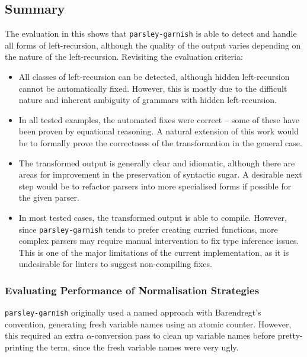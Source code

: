 \documentclass[../../main.tex]{subfiles}
\begin{document}
\subsection*{Summary}
The evaluation in this  shows that \texttt{parsley-garnish} is able to detect and handle all forms of left-recursion, although the quality of the output varies depending on the nature of the left-recursion.
Revisiting the evaluation criteria:
\begin{itemize}
  \item All classes of left-recursion can be detected, although hidden left-recursion cannot be automatically fixed. However, this is mostly due to the difficult nature and inherent ambiguity of grammars with hidden left-recursion.
  \item In all tested examples, the automated fixes were correct -- some of these have been proven by equational reasoning. A natural extension of this work would be to formally prove the correctness of the transformation in the general case.
  \item The transformed output is generally clear and idiomatic, although there are areas for improvement in the preservation of syntactic sugar. A desirable next step would be to refactor  parsers into more specialised forms if possible for the given parser.
  \item In most tested cases, the transformed output is able to compile. However, since \texttt{parsley-garnish} tends to prefer creating curried functions, more complex parsers may require manual intervention to fix type inference issues. This is one of the major limitations of the current implementation, as it is undesirable for linters to suggest non-compiling fixes.
\end{itemize}


\subsubsection{Evaluating Performance of Normalisation Strategies}
\texttt{parsley-garnish} originally used a named approach with Barendregt's convention, generating fresh variable names using an atomic counter.
However, this required an extra $\alpha$-conversion pass to clean up variable names before pretty-printing the term, since the fresh variable names were very ugly.
\end{document}
